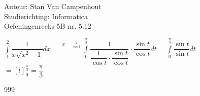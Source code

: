 \documentclass[a4paper]{article}
\begin{document}
  
\noindent \large Auteur: Stan Van Campenhout \\
\noindent \large Studierichting:  Informatica\\
\noindent \large Oefeningenreeks 5B nr. 5.12\\

\medskip

\normalsize

$ \displaystyle\int\limits_1^2\dfrac{1}{x\sqrt{x^2-1}}dx =
\stackrel{x = \tfrac{1}{\cos t}}{=} \displaystyle\int\limits_0^{\tfrac{\pi}{3}}\dfrac{1}{\dfrac{1}{\cos t}\cdot\dfrac{\sin t}{\cos t}}\cdot\dfrac{\sin t}{\cos t}dt
= \displaystyle\int\limits_0^{\tfrac{\pi}{3}}\dfrac{\sin t}{\sin t}dt $\\

$ = \left[t\right]_0^{\tfrac{\pi}{3}} = \dfrac{\pi}{3} $\\


\begin{thebibliography}{999}
\end{thebibliography}
\end{document}
